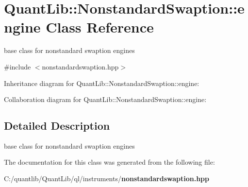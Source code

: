 \section{Quant\+Lib\+:\+:Nonstandard\+Swaption\+:\+:engine Class Reference}
\label{class_quant_lib_1_1_nonstandard_swaption_1_1engine}


base class for nonstandard swaption engines  




{\ttfamily \#include $<$nonstandardswaption.\+hpp$>$}



Inheritance diagram for Quant\+Lib\+:\+:Nonstandard\+Swaption\+:\+:engine\+:


Collaboration diagram for Quant\+Lib\+:\+:Nonstandard\+Swaption\+:\+:engine\+:


\subsection{Detailed Description}
base class for nonstandard swaption engines 

The documentation for this class was generated from the following file\+:\begin{DoxyCompactItemize}
\item 
C\+:/quantlib/\+Quant\+Lib/ql/instruments/{\bf nonstandardswaption.\+hpp}\end{DoxyCompactItemize}
